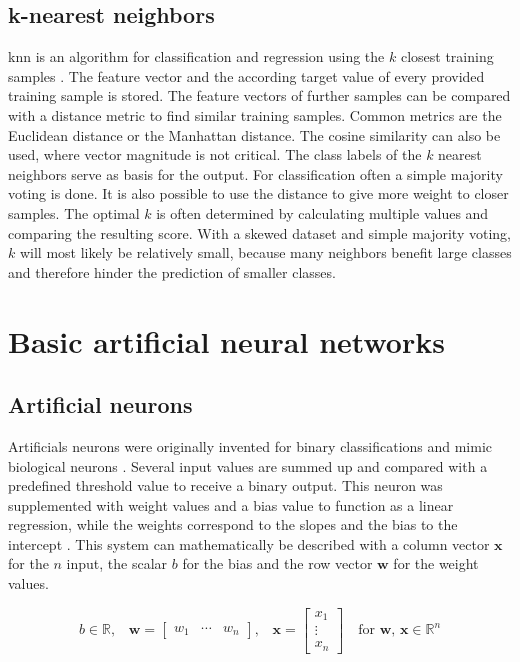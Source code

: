 \subsection{k-nearest neighbors}
\gls{knn} is an algorithm for classification and regression using the $k$ closest training samples \autocite{fix1989,cover1967}. The feature vector and the according target value of every provided training sample is stored. The feature vectors of further samples can be compared with a distance metric to find similar training samples. Common metrics are the Euclidean distance or the Manhattan distance. The cosine similarity can also be used, where vector magnitude is not critical. 
The class labels of the $k$ nearest neighbors serve as basis for the output. For classification often a simple majority voting is done. It is also possible to use the distance to give more weight to closer samples.
The optimal $k$ is often determined by calculating multiple values and comparing the resulting score. With a skewed dataset and simple majority voting, $k$ will most likely be relatively small, because many neighbors benefit large classes and therefore hinder the prediction of smaller classes.

\section{Basic artificial neural networks}
\subsection{Artificial neurons}
Artificials neurons were originally invented for binary classifications and mimic biological neurons \autocite{mcculloch1943}. Several input values are summed up and compared with a predefined threshold value to receive a binary output. This neuron was supplemented with weight values and a bias value to function as a linear regression, while the weights correspond to the slopes and the bias to the intercept  \autocite{rosenblatt1957}. This system can mathematically be described with a column vector $\mathbf{x}$ for the $n$ input, the scalar $b$ for the bias and the row vector $\mathbf{w}$ for the weight values.

\begin{equation}
    \text{$b \in \mathbb{R}$,}\quad\mathbf{w} = \begin{bmatrix}w_1&\cdots &w_n\end{bmatrix}\text{,}\quad\mathbf{x} = \begin{bmatrix}x_1\\\vdots \\x_n\end{bmatrix}\quad\text{for $\mathbf{w}$, $\mathbf{x} \in \mathbb{R}^n$}
\end{equation}

